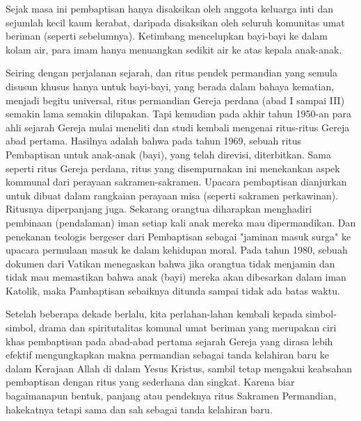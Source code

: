     Sejak masa ini pembaptisan hanya disaksikan oleh anggota keluarga inti dan sejumlah kecil kaum kerabat, daripada disaksikan oleh seluruh komunitas umat beriman (seperti sebelumnya). Ketimbang mencelupkan bayi-bayi ke dalam kolam air, para imam hanya menuangkan sedikit air ke atas kepala anak-anak.

    Seiring dengan perjalanan sejarah, dan ritus pendek permandian yang semula disusun khusus hanya untuk bayi-bayi, yang berada dalam bahaya kematian, menjadi begitu universal, ritus permandian Gereja perdana (abad I sampai III) semakin lama semakin dilupakan. Tapi kemudian pada akhir tahun 1950-an para ahli sejarah Gereja mulai meneliti dan studi kembali mengenai ritus-ritus Gereja abad pertama. Hasilnya adalah bahwa pada tahun 1969, sebuah ritus Pembaptisan untuk anak-anak (bayi), yang telah direvisi, diterbitkan. Sama seperti ritus Gereja perdana, ritus yang disempurnakan ini menekankan aspek kommunal dari perayaan sakramen-sakramen. Upacara pembaptisan dianjurkan untuk dibuat dalam rangkaian perayaan misa (seperti sakramen perkawinan). Ritusnya diperpanjang juga. Sekarang orangtua diharapkan menghadiri pembinaan (pendalaman) iman setiap kali anak mereka mau dipermandikan. Dan penekanan teologis bergeser dari Pembaptisan sebagai "jaminan masuk surga" ke upacara permulaan masuk ke dalam kehidupan moral. Pada tahun 1980, sebuah dokumen dari Vatikan menegaskan bahwa jika orangtua tidak menjamin dan tidak mau memastikan bahwa anak (bayi) mereka akan dibesarkan dalam iman Katolik, maka Pambaptisan sebaiknya ditunda sampai tidak ada batas waktu.

    Setelah beberapa dekade berlalu, kita perlahan-lahan kembali kepada simbol-simbol, drama dan spiritutalitas komunal umat beriman yang merupakan ciri khas pembaptisan pada abad-abad pertama sejarah Gereja yang dirasa lebih efektif mengungkapkan makna permandian sebagai tanda kelahiran baru ke dalam Kerajaan Allah di dalam Yesus Kristus, sambil tetap mengakui keabsahan pembaptisan dengan ritus yang sederhana dan singkat. Karena biar bagaimanapun bentuk, panjang atau pendeknya ritus Sakramen Permandian, hakekatnya tetapi sama dan sah sebagai tanda kelahiran baru.

